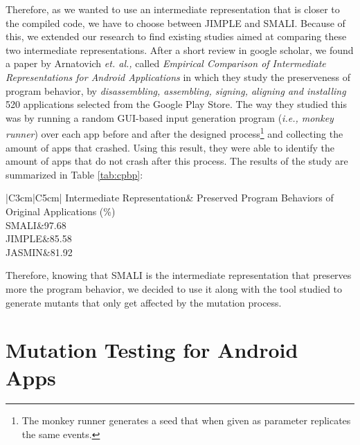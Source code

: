 Therefore, as we wanted to use an intermediate representation that is closer to the compiled code, we have to choose between JIMPLE and SMALI. Because of this, we extended our research to find existing studies aimed at comparing these two intermediate representations. After a short review in google scholar, we found a paper  by Arnatovich \textit{et. al.,}\cite{arnatovich2014empirical} called \textit{Empirical Comparison of Intermediate Representations for Android Applications} in which they study the preserveness of program behavior, by \textit{disassembling, assembling, signing, aligning and installing} 520 applications selected from the Google Play Store. The way they studied this was by running a random GUI-based input generation program (\textit{i.e., monkey runner}) over each app before and after the designed process\footnote{The monkey runner generates a seed that when given as parameter replicates the same events.} and collecting the amount of apps that crashed. Using this result, they were able to identify the amount of apps that do not crash after this process. The results of the study are summarized in Table \ref{tab:cpbp}:

\begin{table}[h!]
	\centering
	\caption{Comparision of program behavior preserveness for SMALI, JIMPLE and JASMIN}
	\label{tab:cpbp}
	\begin{tabular}{|C{3cm}|C{5cm}|}
		\hline
		Intermediate Representation& Preserved Program Behaviors of Original Applications (\%) \\
		\hline \hline
		SMALI&97.68\\
		JIMPLE&85.58\\
		JASMIN&81.92\\
		\hline
	\end{tabular}
\end{table}

Therefore, knowing that SMALI is the intermediate representation that preserves more the program behavior, we decided to use it along with the tool studied to generate mutants that only get affected by the mutation process.

\section{Mutation Testing for Android Apps} \label{sec:MT}

